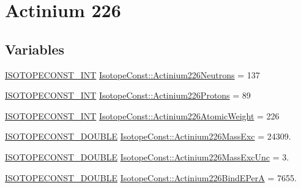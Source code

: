 \hypertarget{group___isotope_const-_actinium-_ac226}{}\section{Actinium 226}
\label{group___isotope_const-_actinium-_ac226}
\subsection*{Variables}
\begin{DoxyCompactItemize}
\item 
\mbox{\hyperlink{group___isotope_const-_macros_ga5f18360b3e99483a35c32d789e62621c}{I\+S\+O\+T\+O\+P\+E\+C\+O\+N\+S\+T\+\_\+\+I\+NT}} \mbox{\hyperlink{group___isotope_const-_actinium-_ac226_ga1c411deb4e5718be57e8519fd6ee370e}{Isotope\+Const\+::\+Actinium226\+Neutrons}} = 137
\item 
\mbox{\hyperlink{group___isotope_const-_macros_ga5f18360b3e99483a35c32d789e62621c}{I\+S\+O\+T\+O\+P\+E\+C\+O\+N\+S\+T\+\_\+\+I\+NT}} \mbox{\hyperlink{group___isotope_const-_actinium-_ac226_ga1c7bfb4eb7851352d74e8e969cbfd926}{Isotope\+Const\+::\+Actinium226\+Protons}} = 89
\item 
\mbox{\hyperlink{group___isotope_const-_macros_ga5f18360b3e99483a35c32d789e62621c}{I\+S\+O\+T\+O\+P\+E\+C\+O\+N\+S\+T\+\_\+\+I\+NT}} \mbox{\hyperlink{group___isotope_const-_actinium-_ac226_ga04703e52d8de132f9f24746cd6908f4f}{Isotope\+Const\+::\+Actinium226\+Atomic\+Weight}} = 226
\item 
\mbox{\hyperlink{group___isotope_const-_macros_ga8f45a7272ce02c0b4c65c44636ed719a}{I\+S\+O\+T\+O\+P\+E\+C\+O\+N\+S\+T\+\_\+\+D\+O\+U\+B\+LE}} \mbox{\hyperlink{group___isotope_const-_actinium-_ac226_gaa9db54fc7f21186e4edc0979a7463440}{Isotope\+Const\+::\+Actinium226\+Mass\+Exc}} = 24309.
\item 
\mbox{\hyperlink{group___isotope_const-_macros_ga8f45a7272ce02c0b4c65c44636ed719a}{I\+S\+O\+T\+O\+P\+E\+C\+O\+N\+S\+T\+\_\+\+D\+O\+U\+B\+LE}} \mbox{\hyperlink{group___isotope_const-_actinium-_ac226_ga8fc5603156e7908ed36c22b700a5db1e}{Isotope\+Const\+::\+Actinium226\+Mass\+Exc\+Unc}} = 3.
\item 
\mbox{\hyperlink{group___isotope_const-_macros_ga8f45a7272ce02c0b4c65c44636ed719a}{I\+S\+O\+T\+O\+P\+E\+C\+O\+N\+S\+T\+\_\+\+D\+O\+U\+B\+LE}} \mbox{\hyperlink{group___isotope_const-_actinium-_ac226_ga121b7a37ad8c0e67d444e400a47b3315}{Isotope\+Const\+::\+Actinium226\+Bind\+E\+PerA}} = 7655.
\item 

\end{DoxyCompactItemize}
